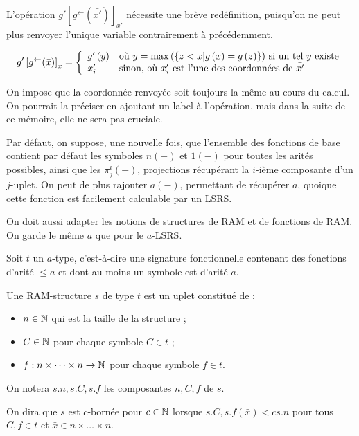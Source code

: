 \documentclass{report}
\newcommand{\eqpred}[3]{#1\left[ #2^{\leftarrow}(#3) \right]_{#3}}
\begin{document}
		\begin{remark}
			L'opération $\eqpred{g'}{g}{\bar{x'}}$ nécessite une brève redéfinition, puisqu'on ne peut plus renvoyer l'unique variable contrairement à \hyperref[def:app_bornee_eq_pred]{précédemment}. 
			
			\[
				\eqpred{g'}{g}{\bar{x}} = \casedist{
												g'\left( \bar{y} \right) & \text{où $\bar{y} = \maxset{\bar{z} < \bar{x} | g\left( \bar{x} \right) = g\left( \bar{z} \right)}$ si un tel $y$ existe} \\
												x'_i & \text{sinon, où $x'_i$ est l'une des coordonnées de $\bar{x'}$}
											}
			\]
			
			On impose que la coordonnée renvoyée soit toujours la même au cours du calcul. On pourrait la préciser en ajoutant un label à l'opération, mais dans la suite de ce mémoire, elle ne sera pas cruciale.
		\end{remark}
		
		\begin{remark}
			\label{rk:fonctions_de_base_LSRS}
			Par défaut, on suppose, une nouvelle fois, que l'ensemble des fonctions de base contient par défaut les symboles $n(-)$ et $1(-)$ pour toutes les arités possibles, ainsi que les $\pi^i_j(-)$, projections récupérant la $i$-ième composante d'un $j$-uplet. On peut de plus rajouter $a(-)$, permettant de récupérer $a$, quoique cette fonction est facilement calculable par un LSRS.
		\end{remark}
		
		On doit aussi adapter les notions de structures de RAM et de fonctions de RAM. On garde le même $a$ que pour le $a$-LSRS.
		
		\begin{definition}
			\label{def:RAM_data_structures_a}
			Soit $t$ un $a$-type, c'est-à-dire une signature fonctionnelle contenant des fonctions d'arité $\leqslant a$ et dont au moins un symbole est d'arité $a$. 
			
			Une RAM-structure $s$ de type $t$ est un uplet constitué de :
			\begin{itemize}[itemsep=-1mm]
				\item 	$n \in \mathbb{N}$ qui est la taille de la structure ;
				\item 	$C \in \mathbb{N}$ pour chaque symbole $C \in t$ ;
				\item 	$f : n\times \dots \times n \to \mathbb{N}$ pour chaque symbole $f \in t$.
			\end{itemize}
			
			On notera $s.n, s.C, s.f$ les composantes $n, C, f$ de $s$.
			
			On dira que $s$ est $c$-bornée pour $c\in\mathbb{N}$ lorsque $s.C, s.f\left(\bar{x}\right) < c s.n$ pour tous $C, f \in t$ et $\bar{x} \in n\times \dots \times n$.
		\end{definition}
		
\end{document}
